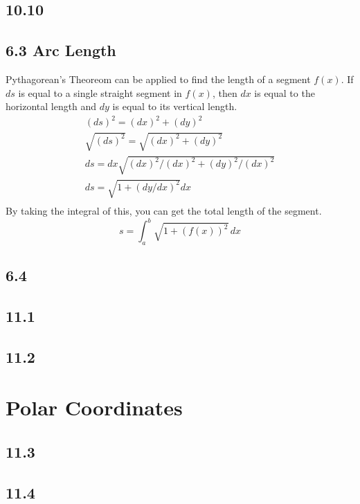 \documentclass{article}
\begin{document}
        \subsection*{10.10}
        \color{OliveGreen}
        \subsection*{6.3 Arc Length}
            Pythagorean's Theoreom can be applied to find the length of a segment \(f(x)\).
            If \(ds\) is equal to a single straight segment in \(f(x)\), then  \(dx\) is equal to the horizontal length and \(dy\) is equal to its vertical length. 
            \begin{equation}
                \begin{split}
                    (ds)^2 = (dx)^2 + (dy)^2 \\
                    \sqrt{(ds)^2} = \sqrt{(dx)^2 + (dy)^2}\\
                    ds = dx  \sqrt{(dx)^2 / (dx)^2 + (dy)^2 / (dx) ^2}\\
                    ds = \sqrt{1 + (dy/dx)^2}dx\\
                \end{split}
            \end{equation}
            By taking the integral of this, you can get the total length of the segment.
            \begin{equation}
                s = \int_a^b \sqrt{1 + (f(x))^2} \, dx
            \end{equation}
        \color{Black}
        \subsection*{6.4}
        \subsection*{11.1}
        \subsection*{11.2}
    \section{Polar Coordinates}
        \subsection*{11.3}
        \subsection*{11.4}
\end{document}
